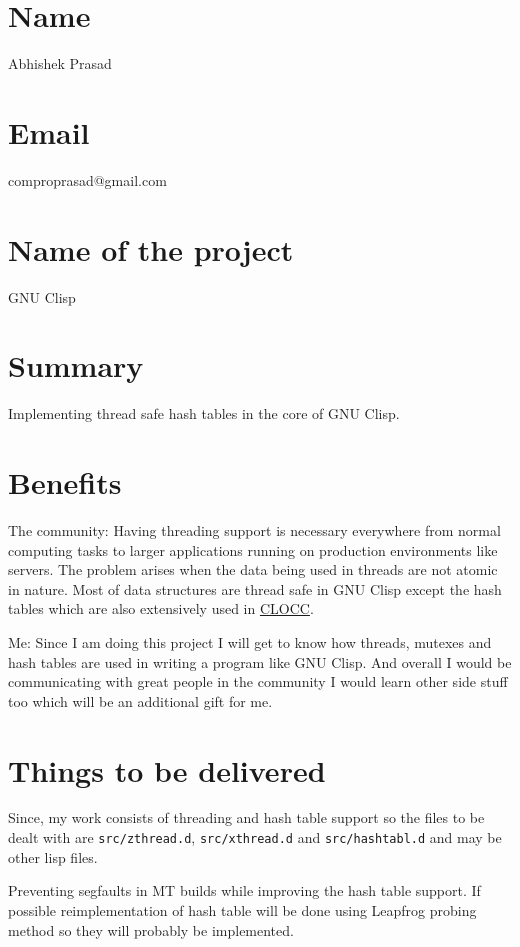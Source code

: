\documentclass[11pt]{article}
\author{Compro Prasad}
\date{\today}
\title{}
\begin{document}
\section*{Name}
\label{sec:orgbbd0645}
Abhishek Prasad
\section*{Email}
\label{sec:orga5e323a}
comproprasad@gmail.com
\section*{Name of the project}
\label{sec:org2a5ee67}
GNU Clisp
\section*{Summary}
\label{sec:org2ea2e3a}
Implementing thread safe hash tables in the core of GNU Clisp.
\section*{Benefits}
\label{sec:org9b30dde}
The community:
Having threading support is necessary everywhere from normal computing tasks to
larger applications running on production environments like servers. The problem
arises when the data being used in threads are not atomic in nature. Most of
data structures are thread safe in GNU Clisp except the hash tables which are
also extensively used in \href{https://sourceforge.net/p/clocc/hg/ci/default/tree/}{CLOCC}.

Me:
Since I am doing this project I will get to know how threads, mutexes and hash
tables are used in writing a program like GNU Clisp. And overall I would be
communicating with great people in the community I would learn other side stuff
too which will be an additional gift for me.
\section*{Things to be delivered}
\label{sec:orga02c250}
Since, my work consists of threading and hash table support so the files to be
dealt with are \texttt{src/zthread.d}, \texttt{src/xthread.d} and \texttt{src/hashtabl.d} and may be
other lisp files.

Preventing segfaults in MT builds while improving the hash table support. If
possible reimplementation of hash table will be done using Leapfrog probing
method so they will probably be implemented.
\end{document}
